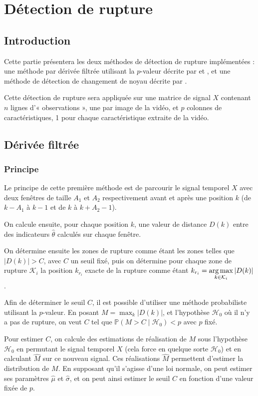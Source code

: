 \chapter{Détection de rupture}

\section{Introduction}

Cette partie présentera les deux méthodes de détection de rupture implémentées : une méthode par dérivée filtrée utilisant la $p$-valeur décrite par \cite{Bertrand11} et \cite{Herault14}, et une méthode de détection de changement de noyau décrite par \cite{Desobry05}.

Cette détection de rupture sera appliquée sur une matrice de signal $X$ contenant $n$ lignes d'« observations », une par image de la vidéo, et $p$ colonnes de caractéristiques, 1 pour chaque caractéristique extraite de la vidéo.

\section{Dérivée filtrée}

\subsection{Principe}

Le principe de cette première méthode est de parcourir le signal temporel $X$ avec deux fenêtres de taille $A_1$ et $A_2$ respectivement avant et après une position $k$ (de $k - A_1$ à $k-1$ et de $k$ à $k+A_2-1$).

On calcule ensuite, pour chaque position $k$, une valeur de distance $D(k)$ entre des indicateurs $\hat{\theta}$ calculés sur chaque fenêtre.

On détermine ensuite les zones de rupture comme étant les zones telles que $|D(k)| > C$, avec $C$ un seuil fixé, puis on détermine pour chaque zone de rupture $\mathcal{K}_i$ la position $k_{r_i}$ exacte de la rupture comme étant $k_{r_i} = \displaystyle \operatorname*{arg\,max}_{k \in \mathcal{K}_i} |D(k)|$.

Afin de déterminer le seuil $C$, il est possible d'utiliser une méthode probabiliste utilisant la $p$-valeur. En posant $M = \displaystyle \max_{k} |D(k)|$, et l'hypothèse $\mathcal{H}_0$ où il n'y a pas de rupture, on veut $C$ tel que $\mathbb{P}(M>C\mid	\mathcal{H}_0) < p$ avec $p$ fixé.

Pour estimer $C$, on calcule des estimations de réalisation de $M$ sous l'hypothèse $\mathcal{H}_0$ en permutant le signal temporel $X$ (cela force en quelque sorte $\mathcal{H}_0$) et en calculant $\hat{M}$ sur ce nouveau signal. Ces réalisations $\hat{M}$ permettent d'estimer la distribution de $M$. En supposant qu'il s'agisse d'une loi normale, on peut estimer ses paramètres $\hat{\mu}$ et $\hat{\sigma}$, et on peut ainsi estimer le seuil $C$ en fonction d'une valeur fixée de $p$.

